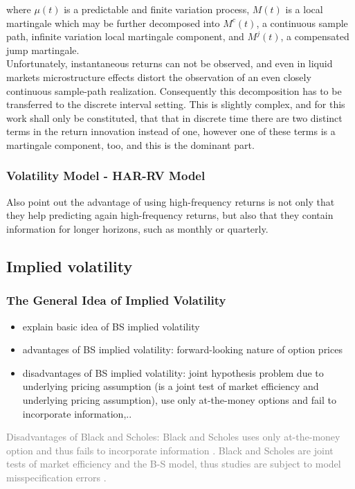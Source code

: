 where $\mu(t)$ is a predictable and finite variation process, $M(t)$ is a local martingale which may be further decomposed into $M^{c}(t)$, a continuous sample path, infinite variation local martingale component, and $M^{j}(t)$, a compensated jump martingale.\\
Unfortunately, instantaneous returns can not be observed, and even in liquid markets microstructure effects distort the observation of an even closely continuous sample-path realization. Consequently this decomposition has to be transferred to the discrete interval setting. This is slightly complex, and for this work shall only be constituted, that that in discrete time there are two distinct terms in the return innovation instead of one, however one of these terms is a martingale component, too, and this is the dominant part. \\




\subsubsection{Volatility Model - HAR-RV Model}

Also \citeauthor{andersen2003} point out the advantage of using high-frequency returns is not only that they help predicting again high-frequency returns, but also that they contain information for longer horizons, such as monthly or quarterly. 


\subsection{Implied volatility}
\subsubsection{The General Idea of Implied Volatility}
\begin{itemize}\itemsep0pt
\item explain basic idea of BS implied volatility
\item advantages of BS implied volatility: forward-looking nature of option prices
\item disadvantages of BS implied volatility: joint hypothesis problem due to underlying  pricing assumption (is a joint test of market efficiency and underlying pricing assumption), use only at-the-money options and fail to incorporate information,..
\end{itemize}

\textcolor{gray}{
Disadvantages of Black and Scholes: Black and Scholes uses only at-the-money option and thus fails to incorporate information \parencite{jiang2003}.
Black and Scholes are joint tests of market efficiency and the B-S model, thus studies are subject to model misspecification errors \parencite{jiang2003}.}


